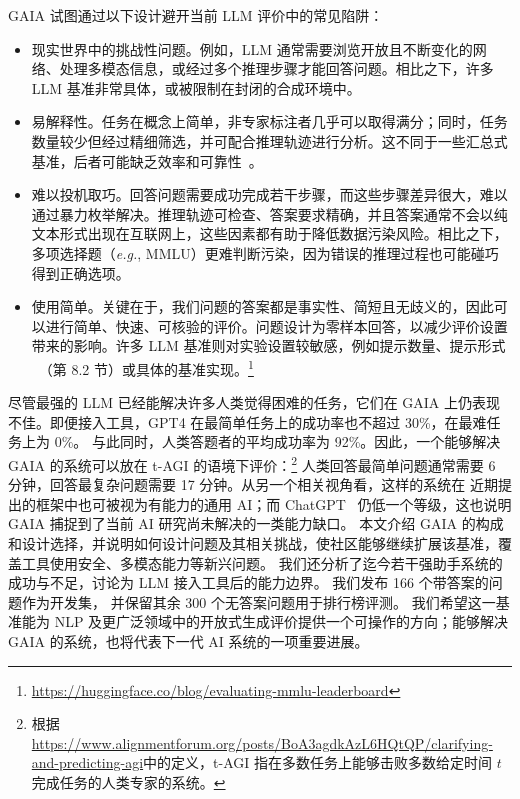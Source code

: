 \documentclass{fairmeta}
\newcommand{\benchmark}{\textsc{GAIA}}
\newcommand{\test}{300}
\newcommand{\dev}{166}
\newcommand{\humanscore}{92\%}
\begin{document}
\benchmark{} 试图通过以下设计避开当前 LLM 评价中的常见陷阱：
\begin{itemize}
 \item[-] 现实世界中的挑战性问题。例如，LLM 通常需要浏览开放且不断变化的网络、处理多模态信息，或经过多个推理步骤才能回答问题。相比之下，许多 LLM 基准非常具体，或被限制在封闭的合成环境中。
 
 \item[-] 易解释性。任务在概念上简单，非专家标注者几乎可以取得满分；同时，任务数量较少但经过精细筛选，并可配合推理轨迹进行分析。这不同于一些汇总式基准，后者可能缺乏效率和可靠性~\citep{perlitz2023efficient}。

 \item[-] 难以投机取巧。回答问题需要成功完成若干步骤，而这些步骤差异很大，难以通过暴力枚举解决。推理轨迹可检查、答案要求精确，并且答案通常不会以纯文本形式出现在互联网上，这些因素都有助于降低数据污染风险。相比之下，多项选择题（\textit{e.g.}, MMLU）更难判断污染，因为错误的推理过程也可能碰巧得到正确选项。
 
\item[-] 使用简单。关键在于，我们问题的答案都是事实性、简短且无歧义的，因此可以进行简单、快速、可核验的评价。问题设计为零样本回答，以减少评价设置带来的影响。许多 LLM 基准则对实验设置较敏感，例如提示数量、提示形式
~\citep{liang2022holistic}（第 8.2 节）或具体的基准实现。\footnote{\url{https://huggingface.co/blog/evaluating-mmlu-leaderboard}}
\end{itemize}

尽管最强的 LLM 已经能解决许多人类觉得困难的任务，它们在 \benchmark{} 上仍表现不佳。即便接入工具，GPT4 在最简单任务上的成功率也不超过 30\%，在最难任务上为 0\%。
与此同时，人类答题者的平均成功率为 \humanscore{}。因此，一个能够解决 \benchmark{} 的系统可以放在 t-AGI 的语境下评价：\footnote{根据\url{https://www.alignmentforum.org/posts/BoA3agdkAzL6HQtQP/clarifying-and-predicting-agi}中的定义，t-AGI 指在多数任务上能够击败多数给定时间 $t$ 完成任务的人类专家的系统。} 人类回答最简单问题通常需要 6 分钟，回答最复杂问题需要 17 分钟。从另一个相关视角看，这样的系统在 \citet{morris2023levels} 近期提出的框架中也可被视为有能力的通用 AI；而 ChatGPT~\citep{openai2023gpt4} 仍低一个等级，这也说明 \benchmark{} 捕捉到了当前 AI 研究尚未解决的一类能力缺口。
本文介绍 \benchmark{} 的构成和设计选择，并说明如何设计问题及其相关挑战，使社区能够继续扩展该基准，覆盖工具使用安全、多模态能力等新兴问题。
我们还分析了迄今若干强助手系统的成功与不足，讨论为 LLM 接入工具后的能力边界。
我们发布 \dev{} 个带答案的问题作为开发集，
并保留其余 \test{} 个无答案问题用于排行榜评测。
我们希望这一基准能为 NLP 及更广泛领域中的开放式生成评价提供一个可操作的方向；能够解决 \benchmark{} 的系统，也将代表下一代 AI 系统的一项重要进展。
\end{document}
